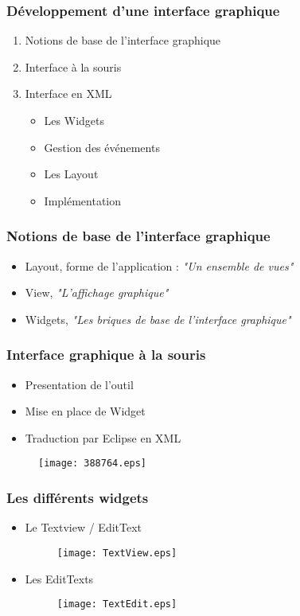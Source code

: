 \documentclass{beamer}
\begin{document}
\begin{frame}
  \frametitle{Développement d'une interface graphique}
  \begin{enumerate}
    \item Notions de base de l'interface graphique
    \item Interface à la souris
    \item Interface en XML
        \begin{itemize}
            \item Les Widgets
            \item Gestion des événements
            \item Les Layout
            \item Implémentation
        \end{itemize}
  \end{enumerate}
\end{frame}



\begin{frame}
  \frametitle{Notions de base de l'interface graphique}
  \begin{itemize}
    \item Layout, forme de l'application : \textit{"Un ensemble de vues"}
     \item View,  \textit{"L'affichage graphique"}
     \item Widgets, \textit{"Les briques de base de l'interface graphique"}
  \end{itemize}
\end{frame}

\begin{frame}
  \frametitle{Interface graphique à la souris}
  \begin{itemize}
    \item Presentation de l'outil
    \item Mise en place de Widget
    \item Traduction par Eclipse en XML
  \end{itemize}
          \begin{figure}
            \centering
                \texttt{[image: 388764.eps]}
        \end{figure}
\end{frame}

\begin{frame}
  \frametitle{Les différents widgets}
  \begin{itemize}
  \item Le Textview / EditText
        \begin{figure}
            \centering
                \texttt{[image: TextView.eps]}
        \end{figure}
    \pause
    \item Les EditTexts
        \begin{figure}
            \centering
                \texttt{[image: TextEdit.eps]}
        \end{figure}
  \end{itemize}
\end{frame}
\end{document}
